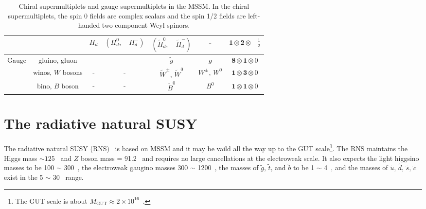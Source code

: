 \begin{table}[htp]
{\begin{tabular}{ccccccc}
                                    &                                                            & $H_{d}$        & $(H^{0}_{d}, \quad H^{-}_{d})$                   & $(\widetilde{H}^{0}_{d}, \quad \widetilde{H}^{-}_{d})$ & -                  & $\mathbf{1} \otimes \mathbf{2} \otimes -\frac{1}{2}$\\
            \hline
            \hline
            \multirow{3}{*}{Gauge}  & gluino, gluon                                              & -              & -                                                & $\widetilde{g}$                                        & $g$                & $\mathbf{8} \otimes \mathbf{1} \otimes 0$\\
                                    & winos, $W$ bosons                                          & -              & -                                                & $\widetilde{W}^{\pm}$, $\widetilde{W}^{0}$             & $W^{\pm}$, $W^{0}$ & $\mathbf{1} \otimes \mathbf{3} \otimes 0$\\
                                    & bino, $B$ boson                                            & -              & -                                                & $\widetilde{B}^{0}$                                    & $B^{0}$            & $\mathbf{1} \otimes \mathbf{1} \otimes 0$\\
            \hline
            \hline
        \end{tabular}
    }
    \caption{Chiral supermultiplets and gauge supermultiplets in the MSSM.
    In the chiral supermultiplets, the spin 0 fields are complex scalars and the spin 1/2 fields are left-handed two-component Weyl spinors.}
    \label{tab:susy_particle_contents}
\end{table}%


\section{The radiative natural SUSY}
\label{sec:susy_rns}
The radiative natural SUSY (RNS)~\cite{Baer:2013xua, Baer:2012up, Baer:2012se, Baer:2012cf} is based on MSSM and it may be vaild all the way up to the GUT scale\footnote{The GUT scale is about $M_{\text{GUT}} \approx 2 \times 10^{16}$~{\GeV}.}.
The RNS maintains the Higgs mass \mh $\sim 125$~{\GeV} and $Z$ boson mass \mZ = 91.2~{\GeV} and requires no large cancellations at the electroweak scale.
It also expects the light higgsino masses to be 100 $\sim$ 300~{\GeV}, the electroweak gaugino masses 300 $\sim$ 1200~{\GeV}, the masses of $\tilde{g}$, $\tilde{t}$, and $\tilde{b}$ to be 1 $\sim$ 4~{\TeV}, and the masses of $\tilde{u}$, $\tilde{d}$, $\tilde{s}$, $\tilde{c}$ exist in the 5 $\sim$ 30~{\TeV} range.

